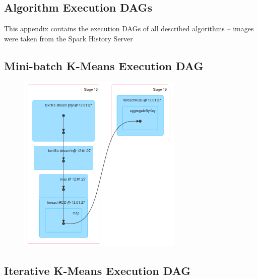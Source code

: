 \documentclass{l4proj}
\begin{document}
\begin{appendices}

\chapter{Algorithm Execution DAGs}

This appendix contains the execution DAGs of all described algorithms -- images were taken from the Spark History Server

\section{Mini-batch K-Means Execution DAG}

\begin{figure}[H]
	\centering
    \label{fig:dag3}
    \includegraphics[width=0.70\textwidth]{images/DAG3}
\end{figure}

\section{Iterative K-Means Execution DAG}


\end{appendices}
\end{document}
